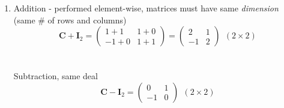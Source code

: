 \begin{enumerate}
For our system, we have\\~\\
$\textbf{X}\boldsymbol{\beta}=%
\textcolor{red}{\left(\begin{array}{cc} 1 & x_1\\ 1 & x_2 \\ 1 & x_3\end{array}\right)\left(\begin{array}{c}\beta_0\\\beta_1\end{array}\right)=\left(\begin{array}{c}\beta_0+\beta_1x_1\\\beta_0+\beta_1x_2\\\beta_0+\beta_1x_3\end{array}\right)}$\\~\\~\\

Note: A special matrix is called the \textbf{Identity Matrix} and is denoted by $\textbf{I}$.  It is a {\em square},
{\em symmetric}, and {\em diagonal} with $1's$ along the diagonal and $0's$
elsewhere:
$$\textbf{I}_3 = \left(\begin{array}{ccc} 1 & 0 & 0 \\ 0 & 1 & 0 \\ 0 & 0 & 1 \end{array}\right) $$
Multiplication of any (conformable) matrix $\textbf{M}$ by $\textbf{I}$ gives $\textbf{M}$:
$\textbf{AI}_2 = \textbf{A} = \textbf{I}_3 \textbf{A}$
~\\~\\

\item Addition - performed element-wise, matrices must have same {\em dimension} (same \# of rows and columns)
\[ 
\textbf{C} + \textbf{I}_2 = 
\left(\begin{array}{cc} 1 + 1 & 1 + 0 \\ -1 + 0  & 1 + 1 \end{array}\right) 
=
\left(\begin{array}{cc} 2 & 1 \\ -1 & 2 \end{array}\right) \ \ (2 \times 2)
\]
~\\~\\
Subtraction, same deal
\[ 
\textbf{C} - \textbf{I}_2 = \left(\begin{array}{cc} 0 & 1 \\ -1 & 0 \end{array}\right) \ \ (2 \times 2)
\]
~\\~\\


\end{enumerate}
